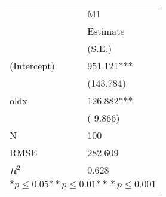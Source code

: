 \begin{tabular}{*{2}{l}}
\hline
                  & M1   \tabularnewline
                   &Estimate \tabularnewline
                 &(S.E.) \tabularnewline
 \hline
 \hline
   (Intercept)     &951.121*** \tabularnewline
                 &(143.784)  \tabularnewline
   oldx            &126.882*** \tabularnewline
                 &(  9.866)  \tabularnewline
 \hline
 N                 &100       \tabularnewline
 RMSE             &282.609   \tabularnewline
 $R^2$             &0.628   \tabularnewline
 \hline
\hline
 
 \multicolumn{2}{c}{${*p}\le 0.05$${*\!\!*p}\le 0.01$${*\!\!*\!\!*p}\le 0.001$}\tabularnewline
 \end{tabular}
